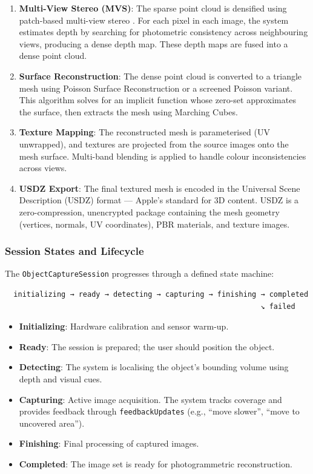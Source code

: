 \begin{enumerate}
    \item \textbf{Multi-View Stereo (MVS)}: The sparse point cloud is densified using patch-based multi-view stereo \cite{furukawa2010pmvs}. For each pixel in each image, the system estimates depth by searching for photometric consistency across neighbouring views, producing a dense depth map. These depth maps are fused into a dense point cloud.

    \item \textbf{Surface Reconstruction}: The dense point cloud is converted to a triangle mesh using Poisson Surface Reconstruction \cite{kazhdan2006poisson} or a screened Poisson variant. This algorithm solves for an implicit function whose zero-set approximates the surface, then extracts the mesh using Marching Cubes.

    \item \textbf{Texture Mapping}: The reconstructed mesh is parameterised (UV unwrapped), and textures are projected from the source images onto the mesh surface. Multi-band blending is applied to handle colour inconsistencies across views.

    \item \textbf{USDZ Export}: The final textured mesh is encoded in the Universal Scene Description (USDZ) format — Apple's standard for 3D content. USDZ is a zero-compression, unencrypted package containing the mesh geometry (vertices, normals, UV coordinates), PBR materials, and texture images.
\end{enumerate}

\subsubsection{Session States and Lifecycle}

The \texttt{ObjectCaptureSession} progresses through a defined state machine:

\begin{verbatim}
  initializing → ready → detecting → capturing → finishing → completed
                                                           ↘ failed
\end{verbatim}

\begin{itemize}
    \item \textbf{Initializing}: Hardware calibration and sensor warm-up.
    \item \textbf{Ready}: The session is prepared; the user should position the object.
    \item \textbf{Detecting}: The system is localising the object's bounding volume using depth and visual cues.
    \item \textbf{Capturing}: Active image acquisition. The system tracks coverage and provides feedback through \texttt{feedbackUpdates} (e.g., ``move slower'', ``move to uncovered area'').
    \item \textbf{Finishing}: Final processing of captured images.
    \item \textbf{Completed}: The image set is ready for photogrammetric reconstruction.
\end{itemize}

